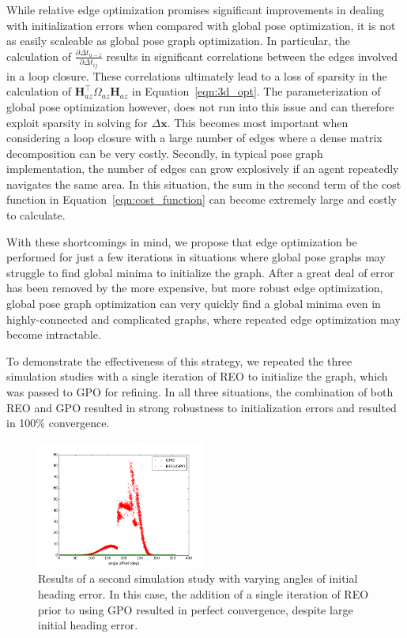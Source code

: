While relative edge optimization promises significant improvements in dealing with initialization errors when compared with global pose optimization, it is not as easily scaleable as global pose graph optimization.  In particular, the calculation of $\frac {\partial\Delta t_{a-z}}{\partial\Delta t_{ij}}$ results in significant correlations between the edges involved in a loop closure.  These correlations ultimately lead to a loss of sparsity in the calculation of $\mathbf{H}_{az}^\top \Omega_{az} \mathbf{H}_{az}$ in Equation~\ref{eqn:3d_opt}.  The parameterization of global pose optimization however, does not run into this issue and can therefore exploit sparsity in solving for $\Delta \mathbf{x}$.  This becomes most important when considering a loop closure with a large number of edges where a dense matrix decomposition can be very costly. Secondly, in typical pose graph implementation, the number of edges can grow explosively if an agent repeatedly navigates the same area.  In this situation, the sum in the second term of the cost function in Equation~\ref{eqn:cost_function} can become extremely large and costly to calculate.

With these shortcomings in mind, we propose that edge optimization be performed for just a few iterations in situations where global pose graphs may struggle to find global minima to initialize the graph.  After a great deal of error has been removed by the more expensive, but more robust edge optimization, global pose graph optimization can very quickly find a global minima even in highly-connected and complicated graphs, where repeated edge optimization may become intractable.

To demonstrate the effectiveness of this strategy, we repeated the three simulation studies with a single iteration of REO to initialize the graph, which was passed to GPO for refining.  In all three situations, the combination of both REO and GPO resulted in strong robustness to initialization errors and resulted in 100\% convergence.

\begin{figure}[H]
  \includegraphics[width=0.5\textwidth]{figures/combined_global_heading_results.png}
  \caption{Results of a second simulation study with varying angles of initial heading error.  In this case, the addition of a single iteration of REO prior to using GPO resulted in perfect convergence, despite large initial heading error.}
  \label{fig:combined_global_heading_results}
\end{figure}

